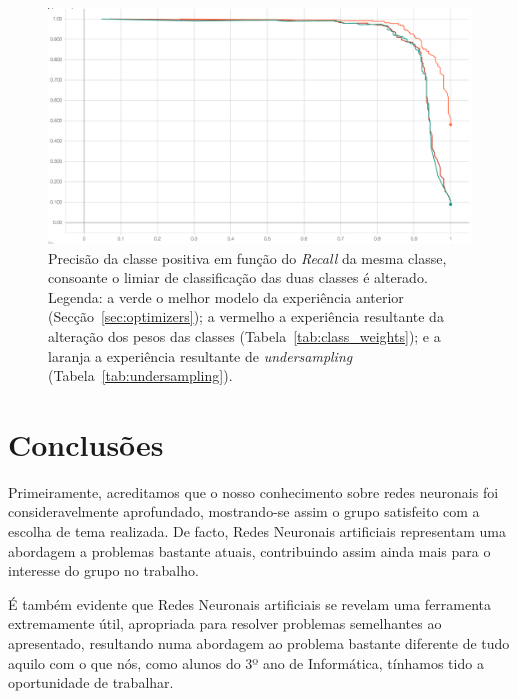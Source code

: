 \documentclass[]{article}
\begin{document}
\begin{figure}[h!]
\centering
\includegraphics[scale=0.30]{img/precision-recall_curve_normal_undersampled_class_weights.png}
\caption{Precisão da classe positiva em função do \textit{Recall} da mesma classe, consoante o limiar de classificação das duas classes é alterado. Legenda: a verde o melhor modelo da experiência anterior (Secção~\ref{sec:optimizers}); a vermelho a experiência resultante da alteração dos pesos das classes (Tabela~\ref{tab:class_weights}); e a laranja a experiência resultante de \textit{undersampling} (Tabela~\ref{tab:undersampling}).}
\label{fig:precision-recall_curve_normal_undersampled_class_weights}
\end{figure}



\section{Conclusões}
\label{sec:conclusao}
	Primeiramente, acreditamos que o nosso conhecimento sobre redes neuronais foi consideravelmente aprofundado, mostrando-se assim o grupo satisfeito com a escolha de tema realizada. De facto, Redes Neuronais artificiais representam uma abordagem a problemas bastante atuais, contribuindo assim ainda mais para o interesse do grupo no trabalho.
    
    É também evidente que Redes Neuronais artificiais se revelam uma ferramenta extremamente útil, apropriada para resolver problemas semelhantes ao apresentado, resultando numa abordagem ao problema bastante diferente de tudo aquilo com o que nós, como alunos do 3º ano de Informática, tínhamos tido a oportunidade de trabalhar.
    
\end{document}
